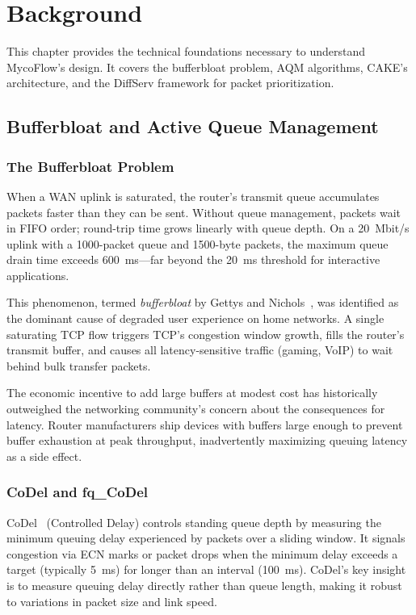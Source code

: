 
\chapter{Background}\label{chapter:background}

This chapter provides the technical foundations necessary to understand MycoFlow's design. It covers the bufferbloat problem, AQM algorithms, CAKE's architecture, and the DiffServ framework for packet prioritization.

\section{Bufferbloat and Active Queue Management}

\subsection{The Bufferbloat Problem}

When a WAN uplink is saturated, the router's transmit queue accumulates packets faster than they can be sent. Without queue management, packets wait in FIFO order; round-trip time grows linearly with queue depth. On a 20~Mbit/s uplink with a 1000-packet queue and 1500-byte packets, the maximum queue drain time exceeds 600~ms---far beyond the 20~ms threshold for interactive applications.

This phenomenon, termed \emph{bufferbloat} by Gettys and Nichols~\cite{gettys2012}, was identified as the dominant cause of degraded user experience on home networks. A single saturating TCP flow triggers TCP's congestion window growth, fills the router's transmit buffer, and causes all latency-sensitive traffic (gaming, VoIP) to wait behind bulk transfer packets.

The economic incentive to add large buffers at modest cost has historically outweighed the networking community's concern about the consequences for latency. Router manufacturers ship devices with buffers large enough to prevent buffer exhaustion at peak throughput, inadvertently maximizing queuing latency as a side effect.

\subsection{CoDel and fq\_CoDel}

CoDel~\cite{nichols2012} (Controlled Delay) controls standing queue depth by measuring the minimum queuing delay experienced by packets over a sliding window. It signals congestion via ECN marks or packet drops when the minimum delay exceeds a target (typically 5~ms) for longer than an interval (100~ms). CoDel's key insight is to measure queuing delay directly rather than queue length, making it robust to variations in packet size and link speed.

